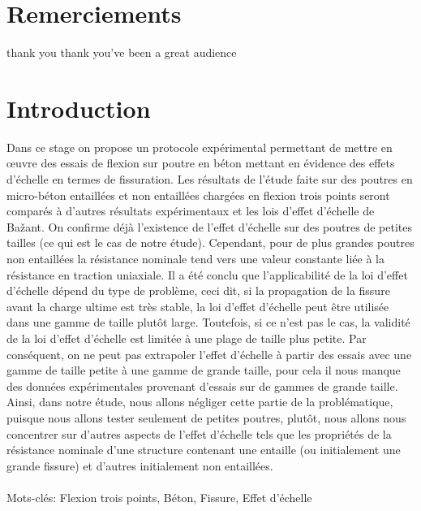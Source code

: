 \documentclass{DGC_M2_report}
\begin{document}
  

\chapter*{Remerciements}
thank you thank you've been a great audience

\renewcommand{\contentsname}{Sommaire} 
\tableofcontents 
\listoffigures

\chapter*{Introduction}
Dans ce stage on propose un protocole expérimental permettant de mettre en œuvre des essais de
flexion sur poutre en béton mettant en évidence des effets d'échelle en termes de fissuration.
Les résultats de l'étude faite sur des poutres en micro-béton entaillées et non entaillées
chargées en flexion trois points seront comparés à d'autres résultats expérimentaux et les lois
d'effet d'échelle de Bažant. On confirme déjà l'existence de l'effet d'échelle sur des poutres de
petites tailles (ce qui est le cas de notre étude). Cependant, pour de plus grandes poutres non
entaillées la résistance nominale tend vers une valeur constante liée à la résistance en traction
uniaxiale. Il a été conclu que l'applicabilité de la loi d'effet d'échelle dépend du type de
problème, ceci dit, si la propagation de la fissure avant la charge ultime est très stable, la loi
d'effet d'échelle peut être utilisée dans une gamme de taille plutôt large. Toutefois, si ce n'est pas
le cas, la validité de la loi d'effet d'échelle est limitée à une plage de taille plus petite. Par
conséquent, on ne peut pas extrapoler l'effet d'échelle à partir des essais avec une gamme de
taille petite à une gamme de grande taille, pour cela il nous manque des données expérimentales
provenant d'essais sur de gammes de grande taille. Ainsi, dans notre étude, nous allons négliger
cette partie de la problématique, puisque nous allons tester seulement de petites poutres, plutôt,
nous allons nous concentrer sur d'autres aspects de l'effet d'échelle tels que les propriétés de la
résistance nominale d'une structure contenant une entaille (ou initialement une grande fissure) et
d'autres initialement non entaillées.\\\\
Mots-clés: Flexion trois points, Béton, Fissure, Effet d'échelle
\end{document}
